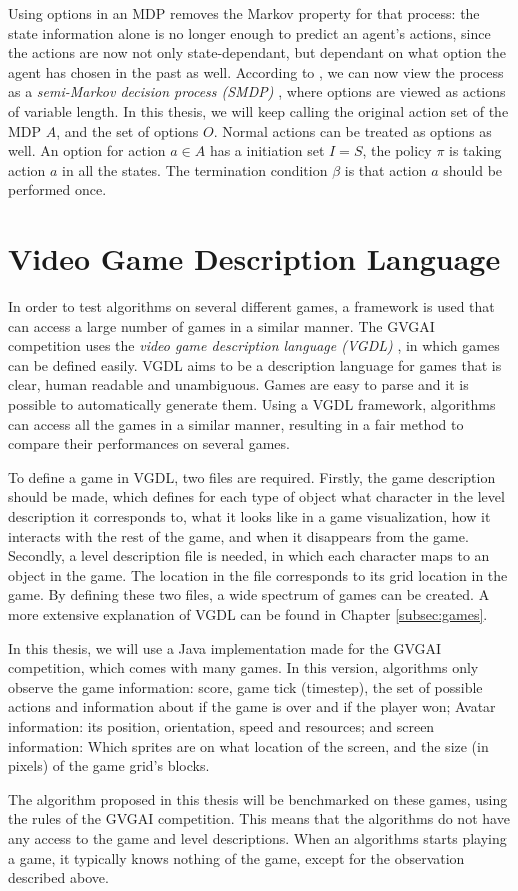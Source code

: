 Using options in an MDP removes the Markov property for that process: the state
information alone is no longer enough to predict an agent's actions, since the
actions are now not only state-dependant, but dependant on what option the agent
has chosen in the past as well. According to \cite{sutton1999between}, we can
now view the process as a \emph{semi-Markov decision process (SMDP)}
\cite{duff1995reinforcement}, where options are viewed as actions of variable
length. In this thesis, we will keep calling the original action set of the MDP
$A$, and the set of options $O$.  Normal actions can be treated as options as
well.  An option for action $a \in A$ has a initiation set $I = S$, the policy
$\pi$ is taking action $a$ in all the states.  The termination condition $\beta$
is that action $a$ should be performed once.


\section{Video Game Description Language}
\label{subsec:vgdl}
In order to test algorithms on several different games, a framework is used that
can access a large number of games in a similar manner. The GVGAI competition
uses the \emph{video game description language (VGDL)} \cite{schaul2013video},
in which games can be defined easily. VGDL aims to be a description language
for games that is clear, human readable and unambiguous. Games are easy to parse
and it is possible to automatically generate them. Using a VGDL framework,
algorithms can access all the games in a similar manner, resulting in a fair
method to compare their performances on several games.

To define a game in VGDL, two files are required. Firstly, the game description
should be made, which defines for each type of object what character in the
level description it corresponds to, what it looks like in a game visualization,
how it interacts with the rest of the game, and when it disappears from the
game. Secondly, a level description file is needed, in which each character maps
to an object in the game. The location in the file corresponds to its grid
location in the game. By defining these two files, a wide spectrum of games
can be created. A more extensive explanation of VGDL can be found in Chapter
\ref{subsec:games}.

In this thesis, we will use a Java implementation made for the GVGAI
competition, which comes with many games. In this version, algorithms only
observe the game information: score, game tick (timestep), the set of possible
actions and information about if the game is over and if the player won; Avatar
information: its position, orientation, speed and resources; and screen
information: Which sprites are on what location of the screen, and the size (in
pixels) of the game grid's blocks.

The algorithm proposed in this thesis will be
benchmarked on these games, using the rules of the GVGAI competition. 
This means that the algorithms do not have any access to the game and level
descriptions. When an algorithms starts playing a game, it typically knows
nothing of the game, except for the observation described above.
